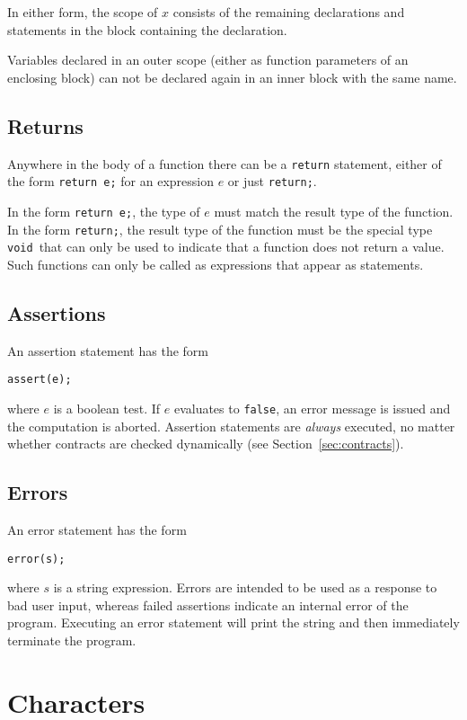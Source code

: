 \documentclass[11pt]{article}
\newcommand{\tvoid}{\texttt{void}}
\begin{document}
In either form, the scope of $x$ consists of the remaining
declarations and statements in the block containing the
declaration.

Variables declared in an outer scope (either as function
parameters of an enclosing block) can not be declared again
in an inner block with the same name.

\subsection{Returns}

Anywhere in the body of a function there can be a \verb'return'
statement, either of the form \verb'return e;' for an expression $e$
or just \verb'return;'.

In the form \verb'return e;', the type of $e$ must match the result
type of the function.  In the form \verb'return;', the result type of
the function must be the special type \tvoid\ that can only be
used to indicate that a function does not return a value.  Such
functions can only be called as expressions that appear as statements.

\subsection{Assertions}

An assertion statement has the form
\begin{verbatim}
assert(e);
\end{verbatim}
where $e$ is a boolean test.  If $e$ evaluates to \verb'false', an
error message is issued and the computation is aborted.  Assertion
statements are \emph{always} executed, no matter whether contracts are
checked dynamically (see Section~\ref{sec:contracts}).

\subsection{Errors}

An error statement has the form
\begin{verbatim}
error(s);
\end{verbatim}
where $s$ is a string expression. Errors are intended to be used as a
response to bad user input, whereas failed assertions indicate an
internal error of the program. Executing an error statement will print
the string and then immediately terminate the program.

\section{Characters}
\end{document}

